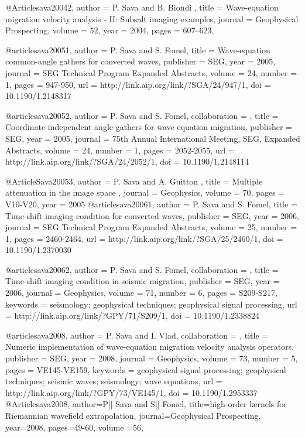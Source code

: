 @Article{sava20042,
 author =  { P. Sava and B. Biondi },
 title =   { Wave-equation migration velocity analysis - {II}:
{Subsalt} imaging examples},
 journal = {Geophysical Prospecting},
 volume = {52},
 year =   {2004},
 pages =  {607--623},
}

@article{sava20051,
  author =	 {P. Sava and S. Fomel},
  title =	 {Wave-equation common-angle gathers for converted
                  waves},
  publisher =	 {SEG},
  year =	 2005,
  journal =	 {SEG Technical Program Expanded Abstracts},
  volume =	 24,
  number =	 1,
  pages =	 {947-950},
  url =		 {http://link.aip.org/link/?SGA/24/947/1},
  doi =		 {10.1190/1.2148317}
}

@article{sava20052,
author = {P. Sava and S. Fomel},
collaboration = {},
title = {Coordinate-independent angle-gathers for wave equation migration},
publisher = {SEG},
year = {2005},
journal = {75th Annual International Meeting, SEG, Expanded Abstracts},
volume = {24},
number = {1},
pages = {2052-2055},
url = {http://link.aip.org/link/?SGA/24/2052/1},
doi = {10.1190/1.2148114}
}

@Article{Sava20053,
  author =	 { P. Sava and A. Guitton },
  title =	 { Multiple attenuation in the image space },
  journal =	 {Geophysics},
  volume =	 70,
  pages =	 {V10-V20},
  year =	 2005
}
@article{sava20061,
  author =	 {P. Sava and S. Fomel},
  title =	 {Time-shift imaging condition for converted waves},
  publisher =	 {SEG},
  year =	 2006,
  journal =	 {SEG Technical Program Expanded Abstracts},
  volume =	 25,
  number =	 1,
  pages =	 {2460-2464},
  url =		 {http://link.aip.org/link/?SGA/25/2460/1},
  doi =		 {10.1190/1.2370030}
}


@article{sava20062,
author = {P. Sava and S. Fomel},
collaboration = {},
title = {Time-shift imaging condition in seismic migration},
publisher = {SEG},
year = {2006},
journal = {Geophysics},
volume = {71},
number = {6},
pages = {S209-S217},
keywords = {seismology; geophysical techniques; geophysical signal processing},
url = {http://link.aip.org/link/?GPY/71/S209/1},
doi = {10.1190/1.2338824}
}

@article{sava2008,
author = {P. Sava and I. Vlad},
collaboration = {},
title = {Numeric implementation of wave-equation migration velocity analysis operators},
publisher = {SEG},
year = {2008},
journal = {Geophysics},
volume = {73},
number = {5},
pages = {VE145-VE159},
keywords = {geophysical signal processing; geophysical techniques; seismic waves; seismology; wave equations},
url = {http://link.aip.org/link/?GPY/73/VE145/1},
doi = {10.1190/1.2953337}
}
@Article{sava2008,
author={P[] Sava and S[] Fomel},
title={high-order kernels for Riemannian wavefield extrapolation},
journal={Geophysical Prospecting},
year=2008,
pages={49-60},
volume ={56},
}

